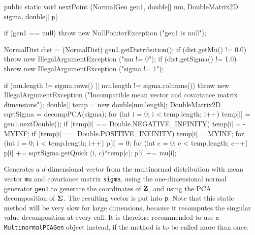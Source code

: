 \begin{code}

   public static void nextPoint (NormalGen gen1, double[] mu,
                                 DoubleMatrix2D sigma, double[] p)\begin{hide} {
      if (gen1 == null)
         throw new NullPointerException ("gen1 is null");

      NormalDist dist = (NormalDist) gen1.getDistribution();
      if (dist.getMu() != 0.0)
         throw new IllegalArgumentException ("mu != 0");
      if (dist.getSigma() != 1.0)
         throw new IllegalArgumentException ("sigma != 1");

      if (mu.length != sigma.rows() ||
          mu.length != sigma.columns())
         throw new IllegalArgumentException
            ("Incompatible mean vector and covariance matrix dimensions");
      double[] temp = new double[mu.length];
      DoubleMatrix2D sqrtSigma = decompPCA(sigma);
      for (int i = 0; i < temp.length; i++) {
         temp[i] = gen1.nextDouble();
         if (temp[i] == Double.NEGATIVE_INFINITY)
            temp[i] = -MYINF;
         if (temp[i] == Double.POSITIVE_INFINITY)
            temp[i] = MYINF;
      }
      for (int i = 0; i < temp.length; i++) {
         p[i] = 0;
         for (int c = 0; c < temp.length; c++)
            p[i] += sqrtSigma.getQuick (i, c)*temp[c];
         p[i] += mu[i];
      }
   }\end{hide}
\end{code}
\begin{tabb} Generates a $d$-dimensional vector from the multinormal 
 distribution with mean vector \texttt{mu} and covariance matrix
 \texttt{sigma}, using the one-dimensional normal generator \texttt{gen1} to
 generate the coordinates of $\textbf{Z}$, and using the PCA decomposition of
 $\boldsymbol{\Sigma}$. The resulting vector is put into \texttt{p}.
 Note that this static method will be very slow for large dimensions, because
 it recomputes the singular value decomposition at every call. It is therefore
 recommended to use a \texttt{MultinormalPCAGen} object instead,
 if the method is to be called more than once.
\end{tabb}
\begin{htmlonly}
\end{htmlonly}
